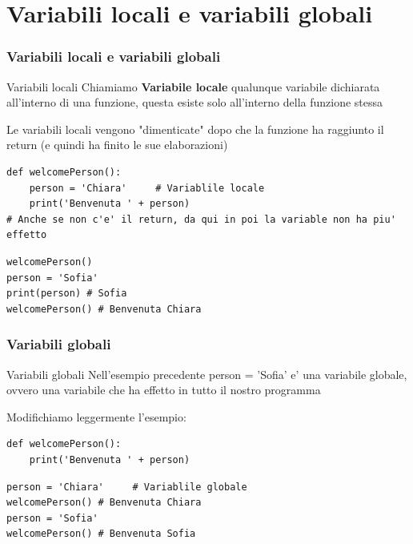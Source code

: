 \documentclass{beamer}
\begin{document}
\section{Variabili locali e variabili globali}

\begin{frame}[fragile]
\frametitle{Variabili locali e variabili globali}
    \begin{block}{Variabili locali}
        Chiamiamo \textbf{Variabile locale} qualunque variabile dichiarata all'interno di una funzione, questa esiste solo all'interno della funzione stessa
        
        Le variabili locali vengono "dimenticate" dopo che la funzione ha raggiunto il return (e quindi ha finito le sue elaborazioni)
    \end{block}
    
    \begin{lstlisting}
def welcomePerson():
    person = 'Chiara'     # Variablile locale
    print('Benvenuta ' + person)
# Anche se non c'e' il return, da qui in poi la variable non ha piu' effetto
    \end{lstlisting}
    
    \begin{lstlisting}
welcomePerson()
person = 'Sofia'
print(person) # Sofia
welcomePerson() # Benvenuta Chiara
    \end{lstlisting}
\end{frame}

\begin{frame}[fragile]
\frametitle{Variabili globali}
    \begin{block}{Variabili globali}
        Nell'esempio precedente person = 'Sofia' e' una variabile globale, ovvero una variabile che ha effetto in tutto il nostro programma
        
        Modifichiamo leggermente l'esempio:
    \end{block}
    
        \begin{lstlisting}
def welcomePerson():
    print('Benvenuta ' + person)
    \end{lstlisting}
    
    \begin{lstlisting}
person = 'Chiara'     # Variablile globale
welcomePerson() # Benvenuta Chiara
person = 'Sofia'
welcomePerson() # Benvenuta Sofia
    \end{lstlisting}
\end{frame}
\end{document}
